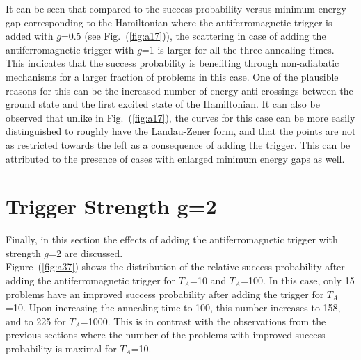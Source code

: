 \documentclass[../main.tex]{subfiles}
\begin{document}
It can be seen that compared to the success probability versus minimum energy gap corresponding to the Hamiltonian where the antiferromagnetic trigger is added with $g$=0.5 (see Fig.~(\ref{fig:a17})), the scattering in case of adding the antiferromagnetic trigger with $g$=1 is larger for all the three annealing times. This indicates that the success probability is benefiting through non-adiabatic mechanisms for a larger fraction of problems in this case. One of the plausible reasons for this can be the increased number of energy anti-crossings between the ground state and the first excited state of the Hamiltonian. It can also be observed that unlike in Fig.~(\ref{fig:a17}), the curves for this case can be more easily distinguished to roughly have the Landau-Zener form, and that the points are not as restricted towards the left as a consequence of adding the trigger. This can be attributed to the presence of cases with enlarged minimum energy gaps as well.


\section{Trigger Strength g=2}
Finally, in this section the effects of adding the antiferromagnetic trigger with strength $g$=2 are discussed.\\
Figure~(\ref{fig:a37}) shows the distribution of the relative success probability after adding the antiferromagnetic trigger for $T_A$=10 and $T_A$=100. In this case, only 15 problems have an improved success probability after adding the trigger for $T_A$=10. Upon increasing the annealing time to 100, this number increases to 158, and to 225 for $T_A$=1000. This is in contrast with the observations from the previous sections where the number of the problems with improved success probability is maximal for $T_A$=10. 
\end{document}
